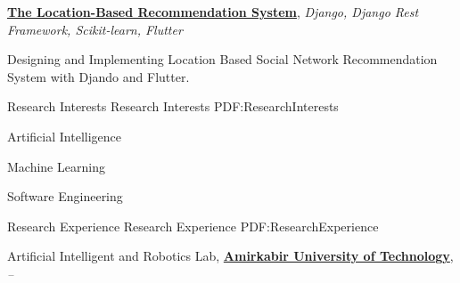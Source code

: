 \documentclass[letterpaper,MMMyyyy,nonstopmode]{resume}
\begin{document}
\begin{Body}
\BigGap
\BulletItem
\href{https://github.com/aliyazdi75/Resume/raw/master/BScThesis-Abstract.pdf}
{\textbf{The Location-Based Recommendation System}},
\textit{\small{Django, Django Rest Framework, Scikit-learn, Flutter}}
\begin{Detail}
\SubBulletItem
Designing and Implementing Location Based Social Network Recommendation System with Djando and Flutter.
\end{Detail}

\newpage






\Section
{Research Interests}
{Research Interests}
{PDF:ResearchInterests}

\BigGap
\BulletItem
Artificial Intelligence

\Gap
\BulletItem
Machine Learning

\Gap
\BulletItem
Software Engineering


\Section
{Research Experience}
{Research Experience}
{PDF:ResearchExperience}

\Entry
Artificial Intelligent and Robotics Lab,
\href{https://aut.ac.ir}
{\textbf{Amirkabir University of Technology}},
\hfill
\textsl{\small{ -- }}


\end{Body}
\end{document}
